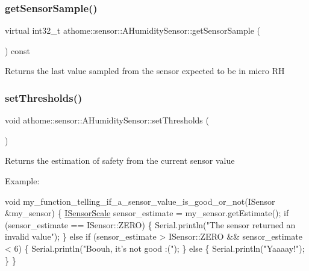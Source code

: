 \subsubsection{\texorpdfstring{get\+Sensor\+Sample()}{getSensorSample()}}
{\footnotesize\ttfamily virtual int32\+\_\+t athome\+::sensor\+::\+A\+Humidity\+Sensor\+::get\+Sensor\+Sample (\begin{DoxyParamCaption}{ }\end{DoxyParamCaption}) const\hspace{0.3cm}{\ttfamily [pure virtual]}}

Returns the last value sampled from the sensor expected to be in micro RH \mbox{\label{classathome_1_1sensor_1_1_a_humidity_sensor_a1a19bfee3db6b0940f1329b42d7ed0d0}} 
\subsubsection{\texorpdfstring{set\+Thresholds()}{setThresholds()}}
{\footnotesize\ttfamily void athome\+::sensor\+::\+A\+Humidity\+Sensor\+::set\+Thresholds (\begin{DoxyParamCaption}\item[{const \mbox{\hyperlink{structathome_1_1sensor_1_1_i_sensor_1_1_i_sensor_thresholds}{I\+Sensor\+Thresholds}} \&}]{ }\end{DoxyParamCaption})\hspace{0.3cm}{\ttfamily [virtual]}}

Returns the estimation of safety from the current sensor value

Example\+:


\begin{DoxyCode}
\textcolor{keywordtype}{void} my\_function\_telling\_if\_a\_sensor\_value\_is\_good\_or\_not(ISensor
&my\_sensor) \{ \mbox{\hyperlink{classathome_1_1sensor_1_1_i_sensor_aa70bc27a4c17c86caf96cca776541ddf}{ISensorScale}} sensor\_estimate = my\_sensor.getEstimate(); \textcolor{keywordflow}{if}
(sensor\_estimate == ISensor::ZERO) \{ Serial.println(\textcolor{stringliteral}{"The sensor returned an}
\textcolor{stringliteral}{invalid value"});
  \}
  \textcolor{keywordflow}{else} \textcolor{keywordflow}{if} (sensor\_estimate > ISensor::ZERO && sensor\_estimate < 6) \{
    Serial.println(\textcolor{stringliteral}{"Boouh, it's not good :("});
  \}
  \textcolor{keywordflow}{else} \{
    Serial.println(\textcolor{stringliteral}{"Yaaaay!"});
  \}
\}
\end{DoxyCode}
 

